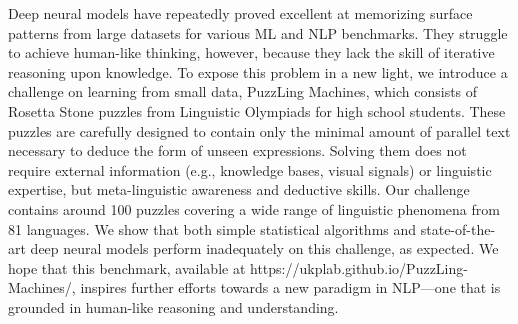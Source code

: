 Deep neural models have repeatedly proved excellent at memorizing surface patterns from large datasets for various ML and NLP benchmarks. They struggle to achieve human-like thinking, however, because they lack the skill of iterative reasoning upon knowledge. To expose this problem in a new light, we introduce a challenge on learning from small data, PuzzLing Machines, which consists of Rosetta Stone puzzles from Linguistic Olympiads for high school students. These puzzles are carefully designed to contain only the minimal amount of parallel text necessary to deduce the form of unseen expressions. Solving them does not require external information (e.g., knowledge bases, visual signals) or linguistic expertise, but meta-linguistic awareness and deductive skills. Our challenge contains around 100 puzzles covering a wide range of linguistic phenomena from 81 languages. We show that both simple statistical algorithms and state-of-the-art deep neural models perform inadequately on this challenge, as expected. We hope that this benchmark, available at https://ukplab.github.io/PuzzLing-Machines/, inspires further efforts towards a new paradigm in NLP---one that is grounded in human-like reasoning and understanding.
